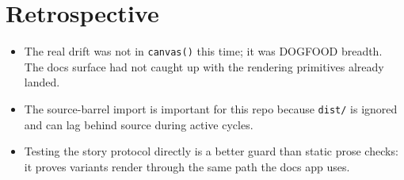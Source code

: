 \section{Retrospective}\label{record-098-retrospective}

\begin{itemize}
\tightlist
\item
  The real drift was not in \texttt{c\allowbreak{}a\allowbreak{}n\allowbreak{}v\allowbreak{}a\allowbreak{}s\allowbreak{}(\allowbreak{})} this time; it was DOGFOOD breadth. The docs surface had not caught up with the rendering primitives already landed.
\item
  The source-barrel import is important for this repo because \texttt{d\allowbreak{}i\allowbreak{}s\allowbreak{}t\allowbreak{}/} is ignored and can lag behind source during active cycles.
\item
  Testing the story protocol directly is a better guard than static prose checks: it proves variants render through the same path the docs app uses.
\end{itemize}


